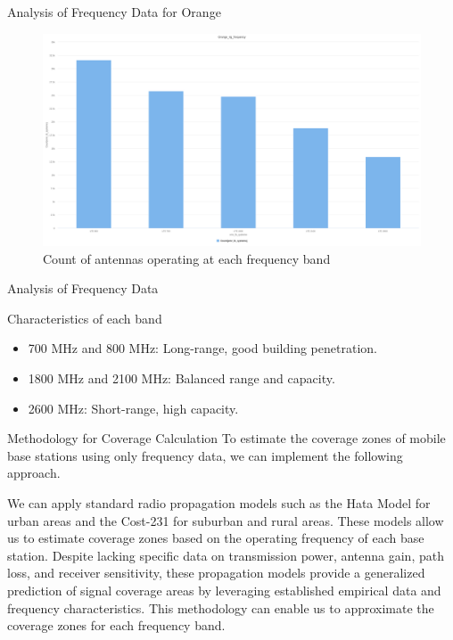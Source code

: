 \begin{frame}{Analysis of Frequency Data for Orange}
    \begin{figure}
        \includegraphics[height=0.6\paperheight]{images/Altair/Or_4g_freq_compar.png}
        \caption{Count of antennas operating at each frequency band}
    \end{figure}
\end{frame}

\begin{frame}{Analysis of Frequency Data}
    \begin{block}{Characteristics of each band}
        \begin{itemize}
            \item 700 MHz and 800 MHz: Long-range, good building penetration.
            \item 1800 MHz and 2100 MHz: Balanced range and capacity.
            \item 2600 MHz: Short-range, high capacity.
        \end{itemize}
    \end{block}

    \begin{block}{Methodology for Coverage Calculation}
        To estimate the coverage zones of mobile base stations using only frequency data, we can implement the following approach. 
        
        We can apply standard radio propagation models such as the Hata Model for urban areas and the Cost-231 for suburban and rural areas.
        These models allow us to estimate coverage zones based on the operating frequency of each base station. Despite lacking specific data on transmission power, antenna gain, path loss, and receiver sensitivity, these propagation models provide a generalized prediction of signal coverage areas by leveraging established empirical data and frequency characteristics.
        This methodology can enable us to approximate the coverage zones for each frequency band.
    \end{block}
\end{frame}

